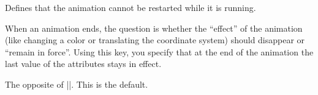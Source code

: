 \begin{command}{\pgfsysanimkeyrestartwhennotactive}
\end{command}
\begin{command}{\pgfsys@animation@restart@whennotactive}
    Defines that the animation cannot be restarted while it is running.
\begin{codeexample}[
    width=2cm,
    preamble={\usetikzlibrary{animations}},
]
\end{codeexample}
\end{command}

\begin{command}{\pgfsysanimkeyfreezeatend}
\end{command}
\begin{command}{\pgfsys@animation@freezeatend}
    When an animation ends, the question is whether the ``effect'' of the
    animation (like changing a color or translating the coordinate system)
    should disappear or ``remain in force''. Using this key, you specify that
    at the end of the animation the last value of the attributes stays in
    effect.
\begin{codeexample}[
    width=6cm,
    preamble={\usetikzlibrary{animations}},
    animation list={1,2,3,4,5,6,7,8},
]
\end{codeexample}
\end{command}

\begin{command}{\pgfsysanimkeyremoveatend}
\end{command}
\begin{command}{\pgfsys@animation@removeatend{}}
    The opposite of |\pgfsysanimkeyfreezeatend|. This is the default.
\begin{codeexample}[
    width=6cm,
    preamble={\usetikzlibrary{animations}},
    animation list={1,2,3,4,5,6,7,8},
]
\end{codeexample}
\end{command}


